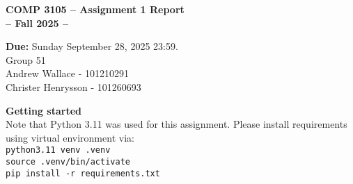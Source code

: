 \documentclass[12pt]{article}
\begin{document}
 

\begin{center} \Large\bf
COMP 3105 -- Assignment 1 Report\\
-- Fall 2025 -- 
\end{center} 

\begin{center}
{\bf Due:} Sunday September 28, 2025 23:59. \\
Group 51 \\
Andrew Wallace - 101210291\\
Christer Henrysson - 101260693\\[1em]
\end{center}
\textbf{Getting started} \\
Note that Python 3.11 was used for this assignment. Please install requirements using virtual environment via: \\
  \texttt{python3.11 venv .venv} \\
  \texttt{source .venv/bin/activate} \\
  \texttt{pip install -r requirements.txt}
\vspace{0.5em}
\newpage 
\end{document}
